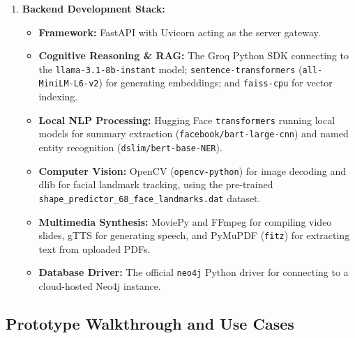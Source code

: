 \documentclass[final,5p,times,twocolumn,authoryear]{elsarticle}
\begin{document}
\begin{enumerate}
    \item \textbf{Backend Development Stack:}
    \begin{itemize}
        \item \textbf{Framework:} FastAPI with Uvicorn acting as the server gateway.
        \item \textbf{Cognitive Reasoning \& RAG:} The Groq Python SDK connecting to the \texttt{llama-3.1-8b-instant} model; \texttt{sentence-transformers} (\texttt{all-MiniLM-L6-v2}) for generating embeddings; and \texttt{faiss-cpu} for vector indexing.
        \item \textbf{Local NLP Processing:} Hugging Face \texttt{transformers} running local models for summary extraction (\texttt{facebook/bart-large-cnn}) and named entity recognition (\texttt{dslim/bert-base-NER}).
        \item \textbf{Computer Vision:} OpenCV (\texttt{opencv-python}) for image decoding and dlib for facial landmark tracking, using the pre-trained \texttt{shape\_predictor\_68\_face\_landmarks.dat} dataset.
        \item \textbf{Multimedia Synthesis:} MoviePy and FFmpeg for compiling video slides, gTTS for generating speech, and PyMuPDF (\texttt{fitz}) for extracting text from uploaded PDFs.
        \item \textbf{Database Driver:} The official \texttt{neo4j} Python driver for connecting to a cloud-hosted Neo4j instance.
    \end{itemize}
\end{enumerate}

\subsection{Prototype Walkthrough and Use Cases}
\label{subsec:walkthrough_usecases}
\end{document}
